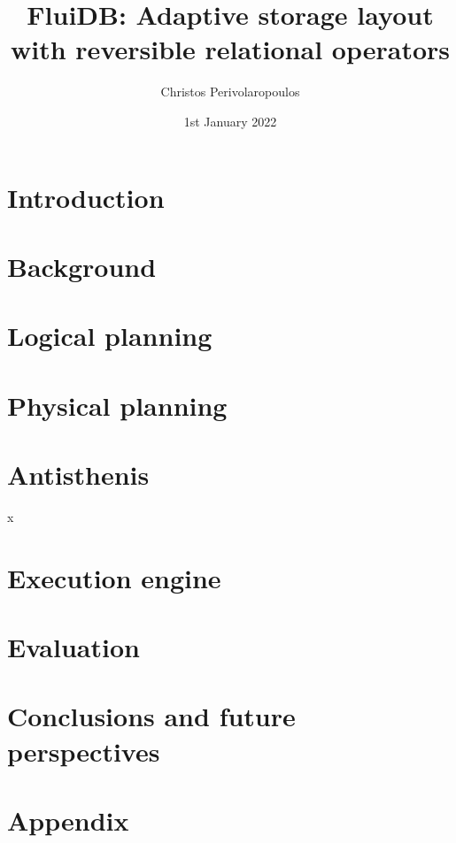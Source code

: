 \documentclass[fontsize=12pt,paper=letter,twosided,cleardoublepage=plain,final]{scrbook}
\title{FluiDB: Adaptive storage layout with reversible relational operators}
\author{Christos Perivolaropoulos}
\date{1st January 2022}
\begin{document}
\frontmatter


\mainmatter

\chapter{Introduction}
\label{chapter:introduction}


\chapter{Background}
\label{chapter:background}


\chapter{Logical planning}
\label{chapter:fluidb_logical_planning}


\chapter{Physical planning}
\label{chapter:physical_planning}


\chapter{Antisthenis}
\label{chapter:antisthenis}
x

\chapter{Execution engine}
\label{chapter:execution_engine}


\chapter{Evaluation}
\label{chapter:evaluation}


\chapter{Conclusions and future perspectives}
\label{chapter:conclusion}


\appendix
\chapter{Appendix}
\label{chapter:appendix}


\begin{spacing}{1}
\printbibliography
\end{spacing}

\backmatter
\end{document}
